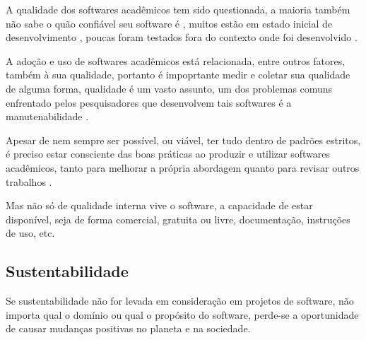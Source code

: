 A qualidade dos softwares acadêmicos tem sido questionada,
a maioria também não sabe o quão confiável seu software é \cite{Merali2010Computational},
muitos estão em estado inicial de desenvolvimento \cite{marshall2013tools},
poucas foram testados fora do contexto onde foi desenvolvido \cite{Portillo12}.

%

A adoção e uso de softwares acadêmicos está relacionada, entre outros fatores,
também à sua qualidade, portanto é impoprtante medir e coletar sua qualidade de
alguma forma, qualidade é um vasto assunto, um dos problemas comuns enfrentado
pelos pesquisadores que desenvolvem tais softwares é a manutenabilidade
\cite{Prlic2012}.

Apesar de nem sempre ser possível, ou viável, ter tudo dentro de padrões
estritos, é preciso estar consciente das boas práticas ao produzir e utilizar
softwares acadêmicos, tanto para melhorar a própria abordagem quanto para
revisar outros trabalhos \cite{wilson2014best}.

Mas não só de qualidade interna vive o software, a capacidade de estar disponível, seja
de forma comercial, gratuita ou livre, documentação, instruções de uso, etc.

\subsection{Sustentabilidade} \label{sustentabilidade}

Se sustentabilidade não for levada em consideração em projetos de software, não
importa qual o domínio ou qual o propósito do software, perde-se a oportunidade
de causar mudanças positivas no planeta e na sociedade.

%

